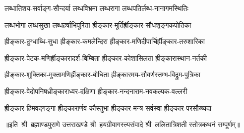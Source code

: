 \twolineshloka
{लब्धातिशय-सर्वाङ्ग-सौन्दर्या लब्धविभ्रमा}
{लब्धरागा लब्धपतिर्लब्ध-नानागमस्थितिः}

\twolineshloka
{लब्धभोगा लब्धसुखा लब्धहर्षाभिपूरिता}
{ह्रीङ्कार-मूर्तिर्ह्रीङ्कार-सौधशृङ्गकपोतिका}

\twolineshloka
{ह्रीङ्कार-दुग्धाब्धि-सुधा ह्रीङ्कार-कमलेन्दिरा}
{ह्रीङ्कार-मणिदीपार्चिर्ह्रीङ्कार-तरुशारिका}

\twolineshloka
{ह्रीङ्कार-पेटक-मणिर्ह्रीङ्कारादर्श-बिम्बिता}
{ह्रीङ्कार-कोशासिलता ह्रीङ्कारास्थान-नर्तकी}

\twolineshloka
{ह्रीङ्कार-शुक्तिका-मुक्तामणिर्ह्रीङ्कार-बोधिता}
{ह्रीङ्कारमय-सौवर्णस्तम्भ-विद्रुम-पुत्रिका}

\twolineshloka
{ह्रीङ्कार-वेदोपनिषध्रीङ्काराध्वर-दक्षिणा}
{ह्रीङ्कार-नन्दनाराम-नवकल्पक-वल्लरी}

\twolineshloka
{ह्रीङ्कार-हिमवद्गङ्गा ह्रीङ्कारार्णव-कौस्तुभा}
{ह्रीङ्कार-मन्त्र-सर्वस्वा ह्रीङ्कार-परसौख्यदा}

॥इति~श्री~ब्रह्माण्डपुराणे उत्तराखण्डे श्री~हयग्रीवागस्त्यसंवादे 
श्री~ललितात्रिशती स्तोत्रकथनं सम्पूर्णम्॥
